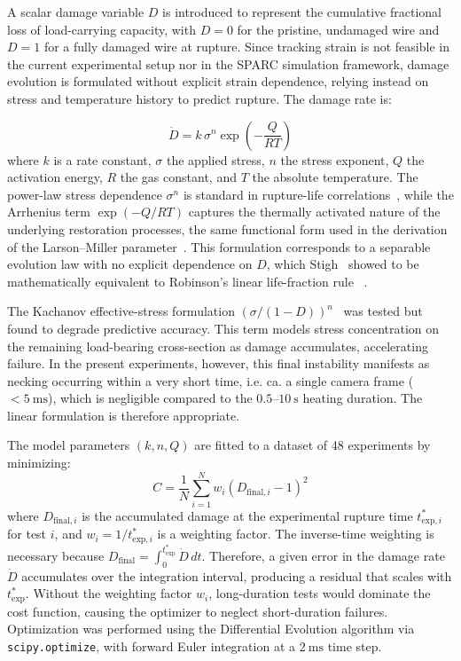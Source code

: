 \documentclass[5p,times,procedia]{elsarticle}
\begin{document}
A scalar damage variable $D$ is introduced to represent the cumulative fractional loss of load-carrying capacity, with $D=0$ for the pristine, undamaged wire and $D=1$ for a fully damaged wire at rupture. Since tracking strain is not feasible in the current experimental setup nor in the SPARC simulation framework, damage evolution is formulated without explicit strain dependence, relying instead on stress and temperature history to predict rupture. The damage rate is:

\begin{equation}\label{eq:damage_rate}
\dot{D} = k\, \sigma^{n} \exp\left(-\frac{Q}{RT}\right)
\end{equation}
where $k$ is a rate constant, $\sigma$ the applied stress, $n$ the stress exponent, $Q$ the activation energy, $R$ the gas constant, and $T$ the absolute temperature. The power-law stress dependence $\sigma^n$ is standard in rupture-life correlations~\cite{zhang2010creep}, while the Arrhenius term $\exp(-Q/RT)$ captures the thermally activated nature of the underlying restoration processes, the same functional form used in the derivation of the Larson--Miller parameter~\cite{larsonmiller1952}. This formulation corresponds to a separable evolution law with no explicit dependence on $D$, which Stigh~\cite{stigh2006} showed to be mathematically equivalent to Robinson's linear life-fraction rule ~\cite{robinson1952}.

The Kachanov effective-stress formulation $(\sigma/(1-D))^{n}$~\cite{kachanov} was tested but found to degrade predictive accuracy. This term models stress concentration on the remaining load-bearing cross-section as damage accumulates, accelerating failure. In the present experiments, however, this final instability manifests as necking occurring within a very short time, i.e. ca. a single camera frame ($<5~\mathrm{ms}$), which is negligible compared to the $0.5$--$10~\mathrm{s}$ heating duration. The linear formulation is therefore appropriate.

The model parameters $(k, n, Q)$ are fitted to a dataset of 48 experiments by minimizing:
\begin{equation}
C = \frac{1}{N}\sum_{i=1}^{N} w_i \left(D_{\mathrm{final},i} - 1\right)^2
\end{equation}
where $D_{\mathrm{final},i}$ is the accumulated damage at the experimental rupture time $t^{*}_{\mathrm{exp},i}$ for test $i$, and $w_i = 1/t^{*}_{\mathrm{exp},i}$ is a weighting factor. The inverse-time weighting is necessary because $D_{\mathrm{final}} = \int_0^{t^{*}_{\mathrm{exp}}} \dot{D}\,dt$. Therefore, a given error in the damage rate $\dot{D}$ accumulates over the integration interval, producing a residual that scales with $t^{*}_{\mathrm{exp}}$. Without the weighting factor $w_i$, long-duration tests would dominate the cost function, causing the optimizer to neglect short-duration failures. Optimization was performed using the Differential Evolution algorithm via \texttt{scipy.optimize}, with forward Euler integration at a $2~\mathrm{ms}$ time step.
\end{document}
